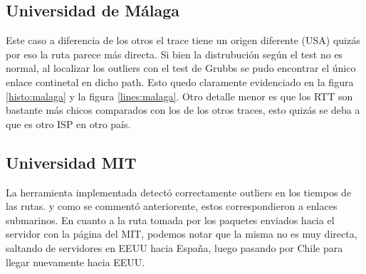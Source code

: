 \subsection{Universidad de Málaga}
Este caso a diferencia de los otros el trace tiene un origen diferente (USA) quizás por eso la ruta parece más directa.
Si bien la distrubución según el test no es normal, al localizar los outliers con el test de Grubbs se pudo encontrar el único enlace continetal en dicho path. Esto quedo claramente evidenciado en la figura \ref{histo:malaga} y la figura \ref{lines:malaga}.
Otro detalle menor es que los RTT son bastante más chicos comparados con los de los otros traces, esto quizás se deba a que es otro ISP en otro país.



\subsection{Universidad MIT}
La herramienta implementada detectó correctamente outliers en los tiempos de las rutas. y como se commentó anteriorente, estos correspondieron a enlaces submarinos. En cuanto a la ruta tomada por los paquetes enviados hacia el servidor con la página del MIT, podemos notar que la misma no es muy directa, saltando de servidores en EEUU hacia España, luego pasando por Chile para llegar nuevamente hacia EEUU. 
